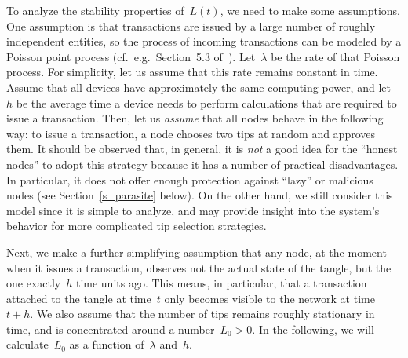 \documentclass[12pt]{article}
\begin{document}
To analyze the stability properties of~$L(t)$, we need 
to make some 
assumptions. 
One 
assumption is that
transactions are issued by a large number
of roughly independent entities, so the process of incoming
transactions can be modeled by a Poisson point process
(cf.\ e.g.\ Section~5.3 of~\cite{Ross_m}).
Let~$\lambda$ be the rate of that Poisson process.
 For simplicity, let us assume 
 that 
this rate remains constant in time. 
Assume that all devices have approximately 
the same computing power, and let~$h$ be the average
time a device needs to perform calculations
that are required to issue a transaction.
Then, let us \emph{assume} that all nodes
behave in the following way:
 to issue a transaction, a node 
  chooses
two tips at random and approves them. 
It should be observed that, in general, it is \emph{not}
a good idea for the ``honest nodes'' to adopt
this strategy because it has a number of practical
disadvantages. In particular, it does not offer enough
protection against ``lazy'' or malicious nodes
(see Section~\ref{s_parasite} below). On the other hand,
we still consider this model since it is simple to analyze,
and 
may provide insight into the system's behavior
for more complicated tip selection strategies.

Next, we make a further simplifying assumption that any node,
at the moment when it issues a transaction, observes not the 
actual state of the tangle, but the one exactly~$h$ time units
ago. This means, in particular, that a transaction
attached to the tangle at time~$t$ only becomes 
visible to the network at time~$t+h$. We also assume 
that the number of tips remains roughly stationary
in time, and is concentrated around a number~$L_0>0$.
In the following, we will calculate~$L_0$ as
a function of~$\lambda$ and~$h$. 
\end{document}
